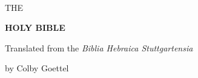 \begin{titlepage}
    ~
    
    {\large THE}
    
    \medskip
    
    {\Huge \textbf{\textsc{HOLY BIBLE}}}
    
    \bigskip
    
    \bigskip
    
    \bigskip
    
    {\large Translated from the \textit{Biblia Hebraica Stuttgartensia}}
    
    \medskip
    
    {by Colby Goettel}
\end{titlepage}
